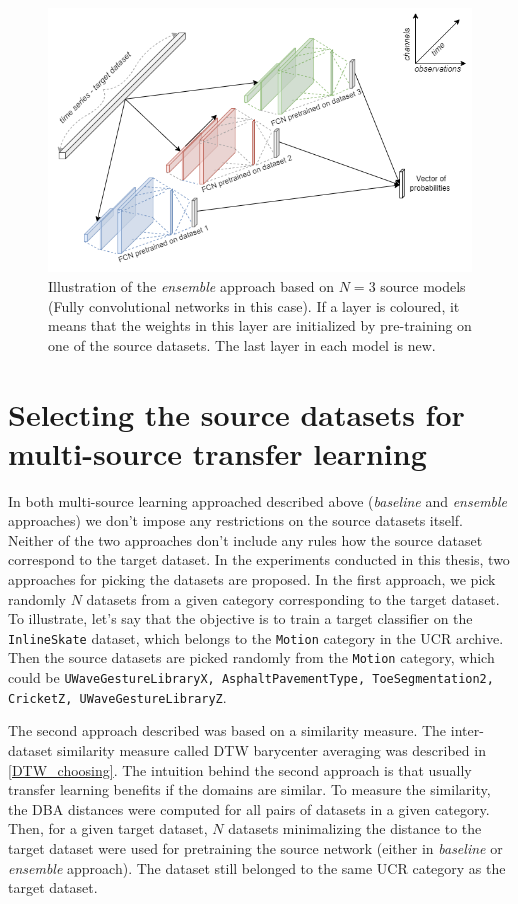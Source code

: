 \documentclass[a4paper,11pt,twoside]{report}
\theoremstyle{definition}
\begin{document}
\FloatBarrier
\begin{figure}[h!]
\centering
\includegraphics[width=17cm]{imgs/ensemble_architecture.png}
\caption{Illustration of the\textit{ ensemble }approach based on $N=3$ source models (Fully convolutional networks in this case). If a layer is coloured, it means that the weights in this layer are initialized by pre-training on one of the source datasets. The last layer in each model is new.}
\label{fig:ensemble_architecture}
\end{figure}

\FloatBarrier


\section{Selecting the source datasets for multi-source transfer learning}\label{section:selecting}
In both multi-source learning approached described above (\textit{baseline} and \textit{ensemble} approaches) we don't impose any restrictions on the source datasets itself. Neither of the two approaches don't include any rules how the source dataset correspond to the target dataset. In the experiments conducted in this thesis, two approaches for picking the datasets are proposed. In the first approach, we pick randomly $N$ datasets from a given category corresponding to the target dataset. To illustrate, let's say that the objective is to train a target classifier on the \texttt{InlineSkate} dataset, which belongs to the \texttt{Motion} category in the UCR archive. Then the source datasets are picked randomly from the \texttt{Motion} category, which could be \texttt{UWaveGestureLibraryX, AsphaltPavementType, ToeSegmentation2, CricketZ, UWaveGestureLibraryZ}.


The second approach described was based on a similarity measure. The inter-dataset similarity measure called DTW barycenter averaging was described in \ref{DTW_choosing}. The intuition behind the second approach is that usually transfer learning benefits if the domains are similar. To measure the similarity, the DBA distances were computed for all pairs of datasets in a given category. Then, for a given target dataset, $N$ datasets minimalizing the distance to the target dataset were used for pretraining the source network (either in \textit{baseline} or \textit{ensemble} approach). The dataset still belonged to the same UCR category as the target dataset.
\end{document}
